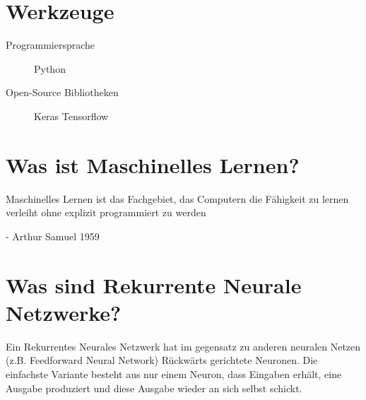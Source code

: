 \documentclass[12pt,a4paper]{article}
\begin{document}
\section{Werkzeuge}
\begin{description}


    \item [Programmiersprache]\tab Python
    \item [Open-Source Bibliotheken]\tab Keras \newline \tab \tab Tensorflow
 
 
\end{description}

\section{Was ist Maschinelles Lernen?}
Maschinelles Lernen ist das Fachgebiet, das Computern die Fähigkeit zu lernen verleiht ohne explizit programmiert zu werden
\begin{flushright} - Arthur Samuel 1959  \end{flushright}

\section{Was sind Rekurrente Neurale Netzwerke?}
Ein Rekurrentes Neurales Netzwerk hat im gegensatz zu anderen neuralen Netzen (z.B. Feedforward Neural Network) Rückwärts gerichtete Neuronen. 
Die einfachste Variante besteht aus nur einem Neuron, dass Eingaben erhält, eine Ausgabe produziert und diese Ausgabe wieder an sich selbst schickt.\newline
\end{document}
